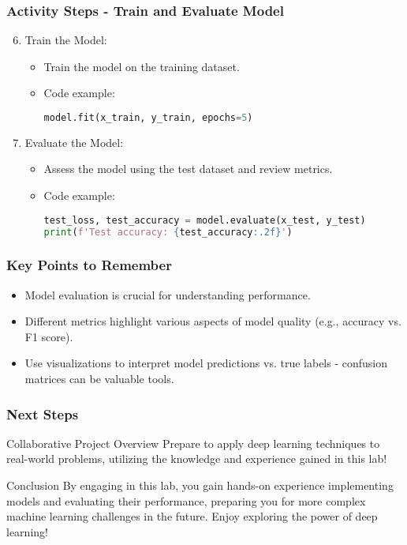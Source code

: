 \documentclass[aspectratio=169]{beamer}
\begin{document}
\begin{frame}[fragile]
    \frametitle{Activity Steps - Train and Evaluate Model}
    \begin{enumerate}
        \setcounter{enumi}{5}
        \item Train the Model:
        \begin{itemize}
            \item Train the model on the training dataset.
            \item Code example:
            \begin{lstlisting}[language=python]
model.fit(x_train, y_train, epochs=5)
            \end{lstlisting}
        \end{itemize}
        
        \item Evaluate the Model:
        \begin{itemize}
            \item Assess the model using the test dataset and review metrics.
            \item Code example:
            \begin{lstlisting}[language=python]
test_loss, test_accuracy = model.evaluate(x_test, y_test)
print(f'Test accuracy: {test_accuracy:.2f}')
            \end{lstlisting}
        \end{itemize}
    \end{enumerate}
\end{frame}

\begin{frame}[fragile]
    \frametitle{Key Points to Remember}
    \begin{itemize}
        \item Model evaluation is crucial for understanding performance.
        \item Different metrics highlight various aspects of model quality (e.g., accuracy vs. F1 score).
        \item Use visualizations to interpret model predictions vs. true labels - confusion matrices can be valuable tools.
    \end{itemize}
\end{frame}

\begin{frame}[fragile]
    \frametitle{Next Steps}
    \begin{block}{Collaborative Project Overview}
        Prepare to apply deep learning techniques to real-world problems, utilizing the knowledge and experience gained in this lab!
    \end{block}
    \begin{block}{Conclusion}
        By engaging in this lab, you gain hands-on experience implementing models and evaluating their performance, preparing you for more complex machine learning challenges in the future. Enjoy exploring the power of deep learning!
    \end{block}
\end{frame}
\end{document}
